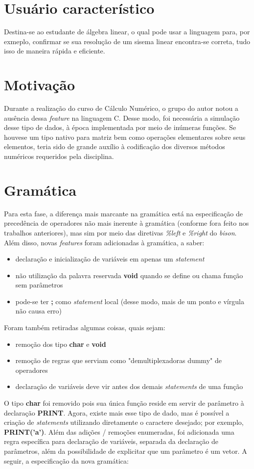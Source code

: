 \documentclass[
	article,			%
	11pt,				%
	oneside,			%
	a4paper,			%
	english,			%
	brazil,				%
	sumario=tradicional
	]{abntex2}
\renewcommand{\it}[1]{\textit{#1}}
\renewcommand{\bf}[1]{\textbf{#1}}
\begin{document}
\section{Usuário característico}
Destina-se ao estudante de álgebra linear, o qual pode usar a linguagem para, por exmeplo, confirmar se sua resolução de um sisema linear encontra-se correta, tudo isso de maneira rápida e eficiente.

\section{Motivação}
Durante a realização do curso de Cálculo Numérico, o grupo do autor notou a ausência dessa \it{feature} na linguagem C. Desse modo, foi necessária a simulação desse tipo de dados, à época implementada por meio de inúmeras funções. Se houvese um tipo nativo para matriz bem como operações elementares sobre seus elementos, teria sido de grande auxílio à codificação dos diversos métodos numéricos requeridos pela disciplina.
\par


\section{Gramática}

Para esta fase, a diferença mais marcante na gramática está na especificação de precedência de operadores não mais inerente à gramática (conforme fora feito nos trabalhos anteriores), mas sim por meio das diretivas \it{\%left} e \it{\%right} do \it{bison}. Além disso, novas \it{features} foram adicionadas à gramática, a saber:
\begin{itemize}
	\item declaração e inicialização de variáveis em apenas um \it{statement}
	\item não utilização da palavra reservada \bf{void} quando se define ou chama função sem parâmetros
	\item pode-se ter \bf{;} como \it{statement} local (desse modo, mais de um ponto e vírgula não causa erro)	
\end{itemize}
Foram também retiradas algumas coisas, quais sejam:
\begin{itemize}
	\item remoção dos tipo \bf{char} e \bf{void}
	\item remoção de regras que serviam como "demultiplexadoras dummy" de operadores
	\item declaração de variáveis deve vir antes dos demais \it{statements} de uma função
\end{itemize}
O tipo \bf{char} foi removido pois sua única função reside em servir de parâmetro à declaração \bf{PRINT}. Agora, existe mais esse tipo de dado, mas é possível a criação de \it{statements} utilizando diretamente o caractere desejado; por exemplo, \bf{PRINT('a')}.
Além das adições / remoções enumeradas, foi adicionada uma regra específica para declaração de variáveis, separada da declaração de parâmetros, além da possibilidade de explicitar que um parâmetro é um vetor.
A seguir, a especificação da nova gramática:
	
\end{document}
